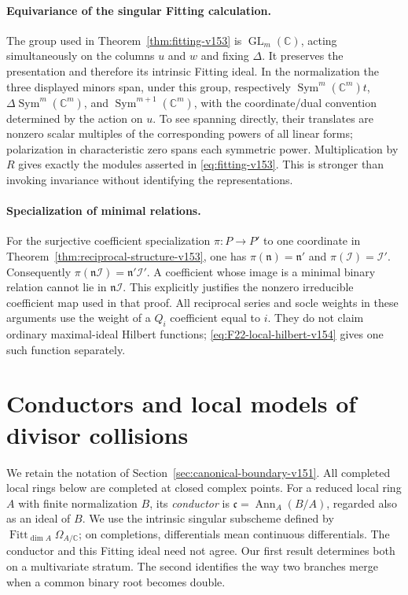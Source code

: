 \documentclass[11pt,reqno]{amsart}
\numberwithin{equation}{section}
\theoremstyle{definition}\newtheorem{definition}[theorem]{Definition}
\theoremstyle{remark}\newtheorem{remark}[theorem]{Remark}
\newcommand{\C}{\mathbb C}\newcommand{\Q}{\mathbb Q}
\DeclareMathOperator{\Sym}{Sym}\DeclareMathOperator{\Gr}{Gr}
\DeclareMathOperator{\Fitt}{Fitt}\DeclareMathOperator{\Ann}{Ann}
\begin{document}
\paragraph{Equivariance of the singular Fitting calculation.}
The group used in Theorem~\ref{thm:fitting-v153} is
$\operatorname{GL}_m(\C)$, acting simultaneously on the columns
$u$ and $w$ and fixing $\Delta$. It preserves the presentation and
therefore its intrinsic Fitting ideal. In the normalization the
three displayed minors span, under this group, respectively
$\Sym^m(\C^m)t$, $\Delta\Sym^m(\C^m)$, and
$\Sym^{m+1}(\C^m)$, with the coordinate/dual convention determined
by the action on $u$. To see spanning directly, their translates
are nonzero scalar multiples of the corresponding powers of all
linear forms; polarization in characteristic zero spans each
symmetric power. Multiplication by $R$ gives exactly the modules
asserted in \eqref{eq:fitting-v153}. This is stronger than invoking
invariance without identifying the representations.

\paragraph{Specialization of minimal relations.}
For the surjective coefficient specialization $\pi:P\to P'$ to
one coordinate in Theorem~\ref{thm:reciprocal-structure-v153}, one
has $\pi(\mathfrak n)=\mathfrak n'$ and
$\pi(\mathcal I)=\mathcal I'$. Consequently
$\pi(\mathfrak n\mathcal I)=\mathfrak n'\mathcal I'$.
A coefficient whose image is a minimal binary relation cannot lie
in $\mathfrak n\mathcal I$. This explicitly justifies the nonzero
irreducible coefficient map used in that proof. All reciprocal
series and socle weights in these arguments use the weight of a
$Q_i$ coefficient equal to $i$. They do not claim ordinary
maximal-ideal Hilbert functions; \eqref{eq:F22-local-hilbert-v154}
gives one such function separately.

\section{Conductors and local models of divisor collisions}
\label{sec:conductor-v152}

We retain the notation of Section~\ref{sec:canonical-boundary-v151}.
All completed local rings below are completed at closed complex points.
For a reduced local ring $A$ with finite normalization $B$, its
\emph{conductor} is $\mathfrak c=\Ann_A(B/A)$, regarded also as an
ideal of $B$.  We use the intrinsic singular subscheme defined by
$\Fitt_{\dim A}\Omega_{A/\C}$; on completions, differentials mean
continuous differentials.  The conductor and this Fitting ideal need
not agree.  Our first result determines both on a multivariate
stratum.  The second identifies the way two branches merge when a
common binary root becomes double.
\end{document}

